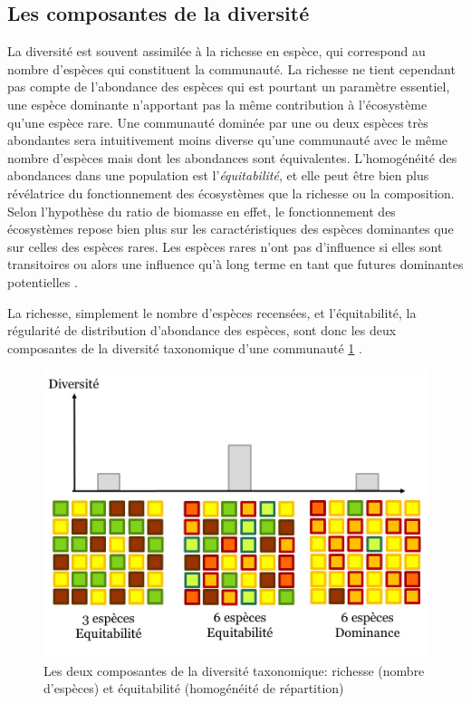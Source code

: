 \documentclass[
  11pt,
  french,
  A4paper,
  extrafontsizes,onecolumn,openright
  ]{memoir}
\begin{document}
\subsection{Les composantes de la
diversité}\label{les-composantes-de-la-diversite}

La diversité est souvent assimilée à la richesse en espèce, qui
correspond au nombre d'espèces qui constituent la communauté. La
richesse ne tient cependant pas compte de l'abondance des espèces qui
est pourtant un paramètre essentiel, une espèce dominante n'apportant
pas la même contribution à l'écosystème qu'une espèce rare. Une
communauté dominée par une ou deux espèces très abondantes sera
intuitivement moins diverse qu'une communauté avec le même nombre
d'espèces mais dont les abondances sont équivalentes. L'homogénéité des
abondances dans une population est l'\emph{équitabilité}, et elle peut
être bien plus révélatrice du fonctionnement des écosystèmes que la
richesse ou la composition. Selon l'hypothèse du ratio de biomasse en
effet, le fonctionnement des écosystèmes repose bien plus sur les
caractéristiques des espèces dominantes que sur celles des espèces
rares. Les espèces rares n'ont pas d'influence si elles sont
transitoires ou alors une influence qu'à long terme en tant que futures
dominantes potentielles \autocite{Grime1998}.

La richesse, simplement le nombre d'espèces recensées, et
l'équitabilité, la régularité de distribution d'abondance des espèces,
sont donc les deux composantes de la diversité taxonomique d'une
communauté \ref{fig:RichEqu} \autocites{Whittaker1965}{Magurran2004}.

\begin{figure}

{\centering \includegraphics[width=0.6\linewidth]{ExternalFig/Fig_RichnessEquitability} 

}

\caption{Les deux composantes de la diversité taxonomique: richesse (nombre d'espèces) et équitabilité (homogénéité de répartition)}\label{fig:RichEqu}
\end{figure}
\end{document}
